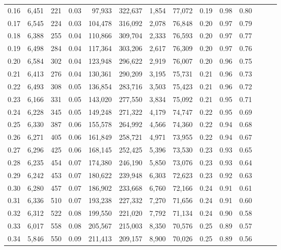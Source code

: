 \begin{tabular}{rrrrrrrrrrrrrr}
0.16 &  6,451 &    221 &  0.03 &   97,933 &  322,637 &   1,854 &  77,072 &  0.19 &  0.98 &      0.80 \\
0.17 &  6,545 &    224 &  0.03 &  104,478 &  316,092 &   2,078 &  76,848 &  0.20 &  0.97 &      0.79 \\
0.18 &  6,388 &    255 &  0.04 &  110,866 &  309,704 &   2,333 &  76,593 &  0.20 &  0.97 &      0.77 \\
0.19 &  6,498 &    284 &  0.04 &  117,364 &  303,206 &   2,617 &  76,309 &  0.20 &  0.97 &      0.76 \\
0.20 &  6,584 &    302 &  0.04 &  123,948 &  296,622 &   2,919 &  76,007 &  0.20 &  0.96 &      0.75 \\
0.21 &  6,413 &    276 &  0.04 &  130,361 &  290,209 &   3,195 &  75,731 &  0.21 &  0.96 &      0.73 \\
0.22 &  6,493 &    308 &  0.05 &  136,854 &  283,716 &   3,503 &  75,423 &  0.21 &  0.96 &      0.72 \\
0.23 &  6,166 &    331 &  0.05 &  143,020 &  277,550 &   3,834 &  75,092 &  0.21 &  0.95 &      0.71 \\
0.24 &  6,228 &    345 &  0.05 &  149,248 &  271,322 &   4,179 &  74,747 &  0.22 &  0.95 &      0.69 \\
0.25 &  6,330 &    387 &  0.06 &  155,578 &  264,992 &   4,566 &  74,360 &  0.22 &  0.94 &      0.68 \\
0.26 &  6,271 &    405 &  0.06 &  161,849 &  258,721 &   4,971 &  73,955 &  0.22 &  0.94 &      0.67 \\
0.27 &  6,296 &    425 &  0.06 &  168,145 &  252,425 &   5,396 &  73,530 &  0.23 &  0.93 &      0.65 \\
0.28 &  6,235 &    454 &  0.07 &  174,380 &  246,190 &   5,850 &  73,076 &  0.23 &  0.93 &      0.64 \\
0.29 &  6,242 &    453 &  0.07 &  180,622 &  239,948 &   6,303 &  72,623 &  0.23 &  0.92 &      0.63 \\
0.30 &  6,280 &    457 &  0.07 &  186,902 &  233,668 &   6,760 &  72,166 &  0.24 &  0.91 &      0.61 \\
0.31 &  6,336 &    510 &  0.07 &  193,238 &  227,332 &   7,270 &  71,656 &  0.24 &  0.91 &      0.60 \\
0.32 &  6,312 &    522 &  0.08 &  199,550 &  221,020 &   7,792 &  71,134 &  0.24 &  0.90 &      0.58 \\
0.33 &  6,017 &    558 &  0.08 &  205,567 &  215,003 &   8,350 &  70,576 &  0.25 &  0.89 &      0.57 \\
0.34 &  5,846 &    550 &  0.09 &  211,413 &  209,157 &   8,900 &  70,026 &  0.25 &  0.89 &      0.56 \\

\end{tabular}
